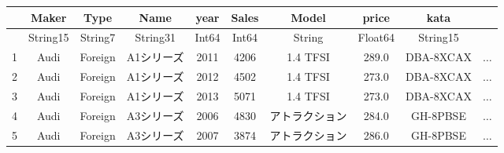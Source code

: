 \documentclass[
  letterpaper,
  DIV=11,
  numbers=noendperiod]{scrreprt}
\begin{document}
\begin{tabular}{r|ccccccccc}
    & Maker & Type & Name & year & Sales & Model & price & kata & \\
    \hline
    & String15 & String7 & String31 & Int64 & Int64 & String & Float64 & String15 & \\
    \hline
    1 & Audi & Foreign & A1シリーズ & 2011 & 4206 & 1.4 TFSI & 289.0 & DBA-8XCAX & $\dots$ \\
    2 & Audi & Foreign & A1シリーズ & 2012 & 4502 & 1.4 TFSI & 273.0 & DBA-8XCAX & $\dots$ \\
    3 & Audi & Foreign & A1シリーズ & 2013 & 5071 & 1.4 TFSI & 273.0 & DBA-8XCAX & $\dots$ \\
    4 & Audi & Foreign & A3シリーズ & 2006 & 4830 & アトラクション & 284.0 & GH-8PBSE & $\dots$ \\
    5 & Audi & Foreign & A3シリーズ & 2007 & 3874 & アトラクション & 286.0 & GH-8PBSE & $\dots$ \\
\end{tabular}
\end{document}
